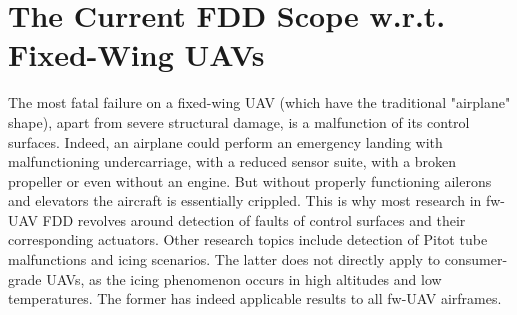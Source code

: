 \chapter{The Current FDD Scope w.r.t. Fixed-Wing UAVs}

The most fatal failure on a fixed-wing UAV (which have the traditional "airplane" shape), apart from severe structural damage, is a malfunction of its control surfaces. Indeed, an airplane could perform an emergency landing with malfunctioning undercarriage, with a reduced sensor suite, with a broken propeller or even without an engine. But without properly functioning ailerons and elevators the aircraft is essentially crippled. This is why most research in fw-UAV FDD revolves around detection of faults of control surfaces and their corresponding actuators.
Other research topics include detection of Pitot tube malfunctions and icing scenarios. The latter does not directly apply to consumer-grade UAVs, as the icing phenomenon occurs in high altitudes and low temperatures. The former has indeed applicable results to all fw-UAV airframes.